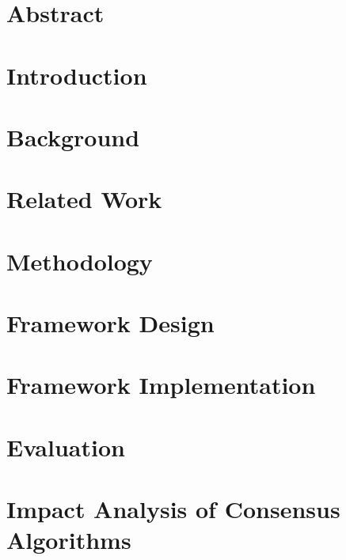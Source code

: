 \documentclass[12pt,a4paper,oneside]{book}
\begin{document}



\chapter*{Abstract}\label{chapter:abstract}


\tableofcontents

\listoffigures

\listoftables

\chapter{Introduction}\label{chapter:introduction}


\chapter{Background}\label{chapter:background}


\chapter{Related Work}\label{chapter:related_work}


\chapter{Methodology}\label{chapter:methodology}


\chapter{Framework Design}\label{chapter:design}


\chapter{Framework Implementation}\label{chapter:implementation}


\chapter{Evaluation}\label{chapter:evaluation}


\chapter{Impact Analysis of Consensus Algorithms}\label{chapter:analysis:consensus_algorithms}

\end{document}
